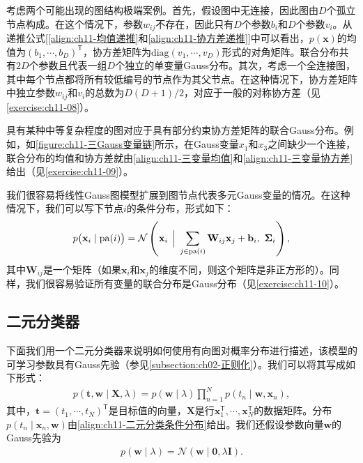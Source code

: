 \documentclass[../../main.tex]{subfiles}
\begin{document}
考虑两个可能出现的图结构极端案例。首先，假设图中无连接，因此图由$D$个孤立节点构成。在这个情况下，参数$w_{ij}$不存在，因此只有$D$个参数$b_i$和$D$个参数$v_i$。从递推公式[\eqref{align:ch11-均值递推}和\eqref{align:ch11-协方差递推}]中可以看出，$p(\mathbf{x})$的均值为$(b_1,\cdots,b_D)^{\mathsf{T}}$，协方差矩阵为$\mathrm{diag}(v_1,\cdots,v_D)$形式的对角矩阵。联合分布共有$2D$个参数且代表一组$D$个独立的单变量Gauss分布。其次，考虑一个全连接图，其中每个节点都将所有较低编号的节点作为其父节点。在这种情况下，协方差矩阵中独立参数$w_{ij}$和$v_i$的总数为$D(D+1)/2$，对应于一般的对称协方差（见\cref{exercise:ch11-08}）。

具有某种中等复杂程度的图对应于具有部分约束协方差矩阵的联合Gauss分布。例如，如\cref{figure:ch11-三Gauss变量链}所示，在Gauss变量$x_1$和$x_3$之间缺少一个连接，联合分布的均值和协方差就由\eqref{align:ch11-三变量均值}和\eqref{align:ch11-三变量协方差}给出（见\cref{exercise:ch11-09}）。

我们很容易将线性Gauss图模型扩展到图节点代表多元Gauss变量的情况。在这种情况下，我们可以写下节点$i$的条件分布，形式如下：
\begin{align}
  p\bigl(\mathbf{x}_i\mid \mathrm{pa}(i)\bigr) = \mathcal{N}\left(\mathbf{x}_i\,\Bigm|\, \sum_{j\in \mathrm{pa}(i)}\mathbf{W}_{ij}\mathbf{x}_j+\mathbf{b}_i,\ \boldsymbol{\Sigma}_i\right),
  \label{align:ch11-多元线性Gauss}
\end{align}
其中$\mathbf{W}_{ij}$是一个矩阵（如果$\mathbf{x}_i$和$\mathbf{x}_j$的维度不同，则这个矩阵是非正方形的）。同样，我们很容易验证所有变量的联合分布是Gauss分布（见\cref{exercise:ch11-10}）。

\subsection{二元分类器}\label{subsection:ch11-二元分类器}

下面我们用一个二元分类器来说明如何使用有向图对概率分布进行描述，该模型的可学习参数具有Gauss先验（参见\cref{subsection:ch02-正则化}）。我们可以将其写成如下形式：
\begin{align}
  p(\mathbf{t},\mathbf{w}\mid \mathbf{X},\lambda) = p(\mathbf{w}\mid \lambda)\prod_{n=1}^{N}p(t_n\mid \mathbf{w},\mathbf{x}_n),
  \label{align:ch11-二元分类联合}
\end{align}
其中，$\mathbf{t}=(t_1,\cdots,t_N)^{\mathsf{T}}$是目标值的向量，$\mathbf{X}$是行$\mathbf{x}_1^{\mathsf{T}},\cdots,\mathbf{x}_N^{\mathsf{T}}$的数据矩阵。分布$p(t_n\mid \mathbf{x}_n,\mathbf{w})$由\eqref{align:ch11-二元分类条件分布}给出。我们还假设参数向量$\mathbf{w}$的Gauss先验为
\begin{align}
  p(\mathbf{w}\mid \lambda) = \mathcal{N}(\mathbf{w}\mid \mathbf{0},\lambda\mathbf{I}).
  \label{align:ch11-权重Gauss先验}
\end{align}
\end{document}
